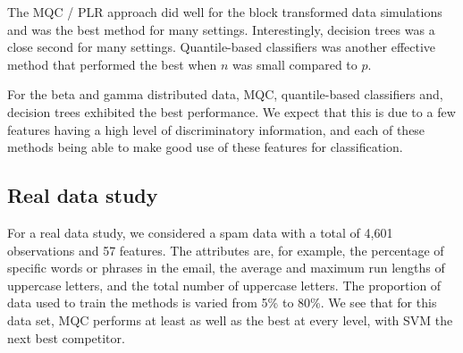 The MQC / PLR approach did well for the block transformed data simulations and
was the best method for many settings.  Interestingly, decision trees was a
close second for many settings.  Quantile-based classifiers was another
effective method that performed the best when $n$ was small compared to $p$.

For the beta and gamma distributed data, MQC, quantile-based classifiers and,
decision trees exhibited the best performance.  We expect that this is due to a
few features having a high level of discriminatory information, and each of
these methods being able to make good use of these features for classification.




\subsection{Real data study}
\label{sec:real-data-study}

For a real data study, we considered a spam data with a total of 4,601
observations and 57 features.  The attributes are, for example, the percentage
of specific words or phrases in the email, the average and maximum run lengths
of uppercase letters, and the total number of uppercase letters.  The proportion
of data used to train the methods is varied from 5\% to 80\%.  We see that for
this data set, MQC performs at least as well as the best at every level, with
SVM the next best competitor.








